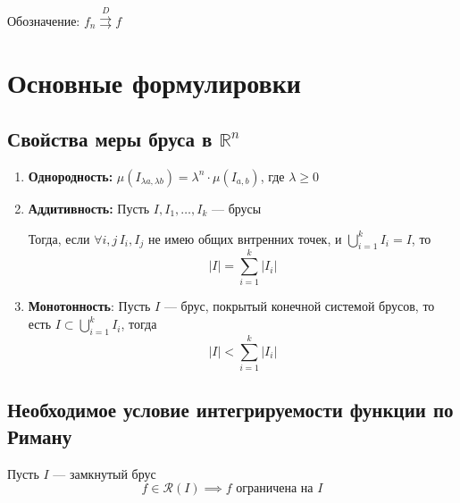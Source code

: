 \documentclass[a4paper]{article}
\begin{document}
Обозначение: $f_n\overset{D}{\rightrightarrows} f$

\newpage
\section{Основные формулировки}
\subsection{Свойства меры бруса в $\mathbb{R}^n$}
\begin{enumerate}
    \item \textbf{Однородность:} $\mu(I_{\lambda a,\lambda b})=\lambda^n\cdot\mu(I_{a,b})$, где $\lambda\geqslant
    0$
    \item \textbf{Аддитивность:} Пусть $I, I_1, \ldots, I_k$ — брусы
    
    Тогда, если $\forall i, j\, I_i, I_j$ не имею общих внтренних точек, и $\displaystyle\bigcup_{i=1}^kI_i = I$, то
    \begin{equation*}
        |I| = \sum_{i=1}^k|I_i|
    \end{equation*}
    \item \textbf{Монотонность}: Пусть $I$ — брус, покрытый конечной системой брусов, то есть $I\subset \displaystyle\bigcup_{i=1}^kI_i$, тогда
    \begin{equation*}
        |I| < \sum_{i=1}^k|I_i|
    \end{equation*}
\end{enumerate}

\subsection{Необходимое условие интегрируемости функции по Риману}
\theorem Пусть $I$ — замкнутый брус
\begin{equation*}
    f\in \mathcal{R}(I) \implies f \text{ ограничена на } I
\end{equation*}
\end{document}
